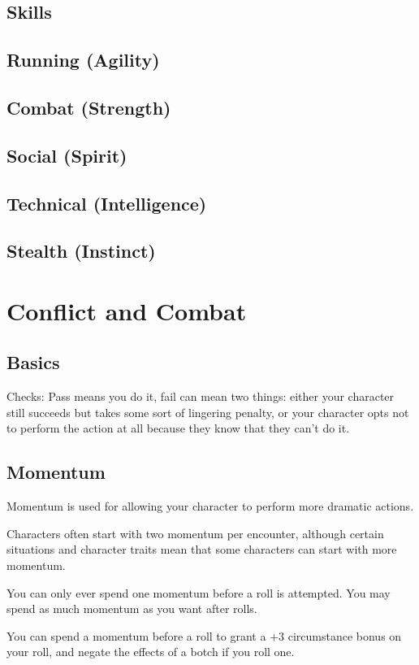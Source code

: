 \documentclass{article}
\begin{document}
\begin{multicols}{2}
\section{Skills}
\subsection{Running (Agility)}
\subsection{Combat (Strength)}
\subsection{Social (Spirit)}
\subsection{Technical (Intelligence)}
\subsection{Stealth (Instinct)}
\end{multicols}
\section{Conflict and Combat}
\subsection{Basics}
Checks: Pass means you do it, fail can mean two things: either your character
still succeeds but takes some sort of lingering penalty, or your character opts
not to perform the action at all because they know that they can’t do it.
\subsection{Momentum}

Momentum is used for allowing your character to perform more dramatic actions.

Characters often start with two momentum per encounter, although certain situations and character traits mean that some characters can start with more momentum.

You can only ever spend one momentum before a roll is attempted. You may spend as much momentum as you want after rolls.

You can spend a momentum before a roll to grant a +3 circumstance bonus on your roll, and negate the effects of a botch if you roll one.
\end{document}
